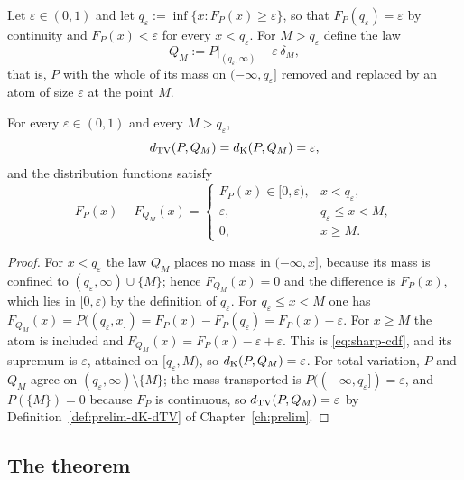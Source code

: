 \documentclass[../../../main.tex]{subfiles}
\begin{document}
\begin{definition}\label{def:sharp-transport}
Let $\varepsilon\in(0,1)$ and let $q_\varepsilon:=\inf\{x:F_P(x)\ge\varepsilon\}$, so that $F_P(q_\varepsilon)=\varepsilon$ by continuity and $F_P(x)<\varepsilon$ for every $x<q_\varepsilon$. For $M>q_\varepsilon$ define the law
\[
Q_M:=P\big|_{(q_\varepsilon,\infty)}+\varepsilon\,\delta_M ,
\]
that is, $P$ with the whole of its mass on $(-\infty,q_\varepsilon]$ removed and replaced by an atom of size $\varepsilon$ at the point $M$.
\end{definition}

\begin{lemma}\label{lem:sharp-dist}
For every $\varepsilon\in(0,1)$ and every $M>q_\varepsilon$,
\[
d_{\mathrm{TV}}(P,Q_M)=d_{\mathrm{K}}(P,Q_M)=\varepsilon,
\]
and the distribution functions satisfy
\begin{equation}\label{eq:sharp-cdf}
F_P(x)-F_{Q_M}(x)=
\begin{cases}
F_P(x)\in[0,\varepsilon), & x<q_\varepsilon,\\
\varepsilon, & q_\varepsilon\le x<M,\\
0, & x\ge M.
\end{cases}
\end{equation}
\end{lemma}

\begin{proof}
For $x<q_\varepsilon$ the law $Q_M$ places no mass in $(-\infty,x]$, because its mass is confined to $(q_\varepsilon,\infty)\cup\{M\}$; hence $F_{Q_M}(x)=0$ and the difference is $F_P(x)$, which lies in $[0,\varepsilon)$ by the definition of $q_\varepsilon$. For $q_\varepsilon\le x<M$ one has $F_{Q_M}(x)=P((q_\varepsilon,x])=F_P(x)-F_P(q_\varepsilon)=F_P(x)-\varepsilon$. For $x\ge M$ the atom is included and $F_{Q_M}(x)=F_P(x)-\varepsilon+\varepsilon$. This is \eqref{eq:sharp-cdf}, and its supremum is $\varepsilon$, attained on $[q_\varepsilon,M)$, so $d_{\mathrm{K}}(P,Q_M)=\varepsilon$. For total variation, $P$ and $Q_M$ agree on $(q_\varepsilon,\infty)\setminus\{M\}$; the mass transported is $P((-\infty,q_\varepsilon])=\varepsilon$, and $P(\{M\})=0$ because $F_P$ is continuous, so $d_{\mathrm{TV}}(P,Q_M)=\varepsilon$ by Definition~\ref{def:prelim-dK-dTV} of Chapter~\ref{ch:prelim}.
\end{proof}

\subsection{The theorem}
\end{document}
